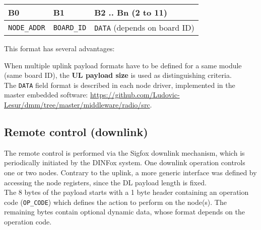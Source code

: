 \begin{table}[!h]
    \centering
    \begin{tabular}{|m{17.4mm}m{17.4mm}m{126mm}|}
        \hline
        \cellcolor{LightGray}\centering \textbf{B0} &
        \cellcolor{LightGray}\centering \textbf{B1} &
        \cellcolor{LightGray}\centering \textbf{B2 .. Bn (2 to 11)} \tabularnewline
        \hline
        \multicolumn{1}{|c|}{\cellcolor{LightBlue}\centering \texttt{NODE\_ADDR}} &
        \multicolumn{1}{|c|}{\cellcolor{PeachPuff}\centering \texttt{BOARD\_ID}} &
        \multicolumn{1}{|c|}{\centering \texttt{DATA} (depends on board ID)} \tabularnewline
        \hline
    \end{tabular}
\end{table}

This format has several advantages:


When multiple uplink payload formats have to be defined for a same module (same board ID), the \textbf{UL payload size} is used as distinguishing criteria.
\medskip \\
The \texttt{DATA} field format is described in each node driver, implemented in the master embedded software: \url{https://github.com/Ludovic-Lesur/dmm/tree/master/middleware/radio/src}.

\newpage

\subsection{Remote control (downlink)}

The remote control is performed via the Sigfox downlink mechanism, which is periodically initiated by the DINFox system. One downlink operation controls one or two nodes. Contrary to the uplink, a more generic interface was defined by accessing the node registers, since the DL payload length is fixed.
\medskip \\
The 8 bytes of the payload starts with a 1 byte header containing an operation code (\texttt{OP\_CODE}) which defines the action to perform on the node(s). The remaining bytes contain optional dynamic data, whose format depends on the operation code. \pfs

